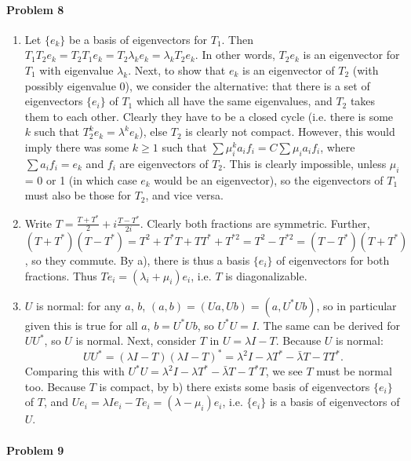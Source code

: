 \documentclass[12pt]{article}
\begin{document}
\paragraph{Problem 8}
\begin{enumerate}[label=\alph*)]
\item Let $\{e_k\}$ be a basis of eigenvectors for $T_1$. Then $T_1T_2e_k =
  T_2T_1e_k = T_2\lambda_ke_k = \lambda_kT_2e_k$. In other words, $T_2e_k$ is
  an eigenvector for $T_1$ with eigenvalue $\lambda_k$. Next, to show that
  $e_k$ is an eigenvector of $T_2$ (with possibly eigenvalue 0), we consider
  the alternative: that there is a set of eigenvectors $\{e_i\}$ of $T_1$ which
  all have the same eigenvalues, and $T_2$ takes them to each other. Clearly
  they have to be a closed cycle (i.e. there is some $k$ such that $T_2^ke_k =
  \lambda^ke_k$), else $T_2$ is clearly not compact. However, this would imply
  there was some $k\geq 1$ such that $\sum\mu_i^ka_if_i = C\sum\mu_ia_if_i$,
  where $\sum a_if_i = e_k$ and $f_i$ are eigenvectors of $T_2$. This is
  clearly impossible, unless $\mu_i$ = 0 or 1 (in which case $e_k$ would be an
  eigenvector), so the eigenvectors of $T_1$ must also be those for
  $T_2$, and vice versa.
\item Write $T = \frac{T+T^*}{2} + i\frac{T-T^*}{2i}$. Clearly both fractions
  are symmetric. Further, $(T+T^*)(T-T^*)= T^2 + T^*T+TT^*+T^{*2} = T^2-T^{*2}
  = (T-T^*)(T+T^*)$, so they commute. By a), there is thus a basis $\{e_i\}$ of
  eigenvectors for both fractions. Thus $Te_i = (\lambda_i + \mu_i)e_i$, i.e.
  $T$ is diagonalizable.
\item $U$ is normal: for any $a$, $b$, $(a,b) = (Ua,Ub) = (a,U^*Ub)$, so
  in particular given this is true for all $a$, $b = U^*Ub$, so $U^*U = I$.
  The same can be derived for $UU^*$, so $U$ is normal. Next, consider $T$
  in $U = \lambda I - T$. Because $U$ is normal:
  \begin{displaymath}
    UU^* = (\lambda I-T)(\lambda I-T)^*= \lambda^2I- \lambda T^* - \bar{\lambda}
    T - TT^*.
  \end{displaymath}
  Comparing this with $U^*U = \lambda^2I-\lambda T^*-\bar{\lambda}T-T^*T$, we
  see $T$ must be normal too. Because $T$ is compact, by b) there exists some
  basis of eigenvectors $\{e_i\}$ of $T$, and $Ue_i = \lambda Ie_i-Te_i =
  (\lambda - \mu_i)e_i$, i.e. $\{e_i\}$ is a basis of eigenvectors of $U$.
\end{enumerate}

\paragraph{Problem 9}
\end{document}
